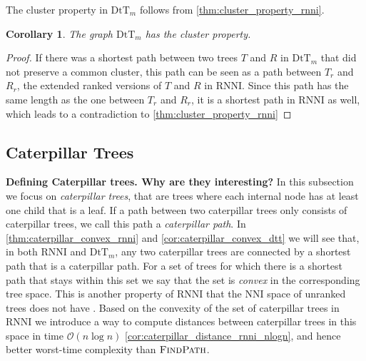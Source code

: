 \documentclass[11pt]{amsart}
\newtheorem{corollary}{Corollary}
\newcommand{\rnni}{\mathrm{RNNI}}
\newcommand{\findpath}{\textsc{FindPath}}
\newcommand{\nni}{\mathrm{NNI}}
\newcommand{\dtt}{\mathrm{DtT}}
\renewcommand{\O}{\mathcal O}
\newcommand{\summary}[1]{\textbf{#1}} %
\begin{document}
The cluster property in $\dtt_m$ follows from \autoref{thm:cluster_property_rnni}.

\begin{corollary}
	The graph $\dtt_m$ has the cluster property.
\end{corollary}

\begin{proof}
	If there was a shortest path between two trees $T$ and $R$ in $\dtt_m$ that did not preserve a common cluster, this path can be seen as a path between $T_r$ and $R_r$, the extended ranked versions of $T$ and $R$ in $\rnni$.
	Since this path has the same length as the one between $T_r$ and $R_r$, it is a shortest path in $\rnni$ as well, which leads to a contradiction to \autoref{thm:cluster_property_rnni}
\end{proof}

\subsection{Caterpillar Trees}

\summary{Defining Caterpillar trees. Why are they interesting?}
In this subsection we focus on \emph{caterpillar trees}, that are trees where each internal node has at least one child that is a leaf.
If a path between two caterpillar trees only consists of caterpillar trees, we call this path a \emph{caterpillar path}.
In \autoref{thm:caterpillar_convex_rnni} and \autoref{cor:caterpillar_convex_dtt} we will see that, in both $\rnni$ and $\dtt_m$, any two caterpillar trees are connected by a shortest path that is a caterpillar path.
For a set of trees for which there is a shortest path that stays within this set we say that the set is \emph{convex} in the corresponding tree space.
This is another property of $\rnni$ that the $\nni$ space of unranked trees does not have \autocite{Gavryushkin2018-ol}.
Based on the convexity of the set of caterpillar trees in $\rnni$ we introduce a way to compute distances between caterpillar trees in this space in time $\O(n\log n)$ \autoref{cor:caterpillar_distance_rnni_nlogn}, and hence better worst-time complexity than $\findpath$.

\end{document}
